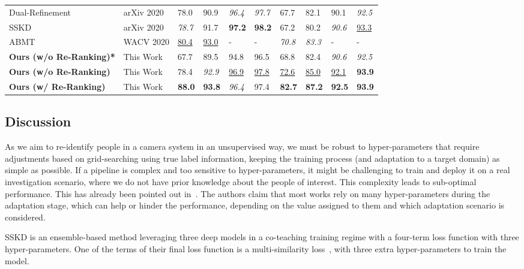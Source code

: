 \documentclass[journal]{IEEEtran}
\begin{document}
\begin{table*}[!ht]
\begin{tabular}{|p{2.7cm}| p{2.0cm}|p{0.8cm}|p{1.0cm}|p{1.0cm}|p{1.0cm}|p{0.8cm}|p{1.0cm}|p{1.0cm}|p{1.0cm}|}
Dual-Refinement \cite{dai2020dual} & arXiv 2020 & 78.0 & 90.9 & \textit{96.4} & \textit{97.7} & 67.7 & 82.1 & 90.1 & \textit{92.5} \\
SSKD \cite{yin2020sskd} & arXiv 2020 & \textit{78.7} & 91.7 & \textbf{97.2} & \textbf{98.2} & 67.2 & 80.2 & \textit{90.6} & \underline{93.3} \\ 
ABMT \cite{chen2020enhancing} & WACV 2020 & \underline{80.4} & \underline{93.0} & - & - & \textit{70.8} & \textit{83.3} & - & - \\
\hline
\textbf{Ours (w/o Re-Ranking)*} & This Work & 67.7 & 89.5  & 94.8 & 96.5 & 68.8 & 82.4 & \textit{90.6} & \textit{92.5} \\ \hline
\textbf{Ours (w/o Re-Ranking)} & This Work & 78.4 & \textit{92.9} & \underline{96.9} & \underline{97.8} & \underline{72.6} & \underline{85.0} & \underline{92.1} & \textbf{93.9} \\ \hline
\textbf{Ours (w/ Re-Ranking)} & This Work & \textbf{88.0} & \textbf{93.8} & \textit{96.4} & 97.4 & \textbf{82.7} & \textbf{87.2} & \textbf{92.5} & \textbf{93.9} \\ \hline
\end{tabular}
\end{table*}

\subsection{Discussion}
\label{sec:discussion}

As we aim to re-identify people in a camera system in an unsupervised way, we must be robust to hyper-parameters that require adjustments based on grid-searching using true label information, keeping the training process (and adaptation to a target domain) as simple as possible. If a pipeline is complex and too sensitive to hyper-parameters, it might be challenging to train and deploy it on a real investigation scenario, where we do not have prior knowledge about the people of interest. This complexity leads to sub-optimal performance. 
This has already been pointed out in~\cite{dubourvieux2020unsupervised}. The authors claim that most works rely on many hyper-parameters during the adaptation stage, which can help or hinder the performance, depending on the value assigned to them and which adaptation scenario is considered.

SSKD\cite{yin2020sskd} is an ensemble-based method leveraging three deep models in a co-teaching training regime with a four-term loss function with three hyper-parameters. One of the terms of their final loss function is a multi-similarity loss~\cite{wang2019multi}, with three extra hyper-parameters to train the model.  
\end{document}
